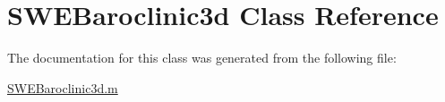 \hypertarget{class_s_w_e_baroclinic3d}{}\section{S\+W\+E\+Baroclinic3d Class Reference}
\label{class_s_w_e_baroclinic3d}


The documentation for this class was generated from the following file\+:\begin{DoxyCompactItemize}
\item 
\hyperlink{_s_w_e_baroclinic3d_8m}{S\+W\+E\+Baroclinic3d.\+m}\end{DoxyCompactItemize}
